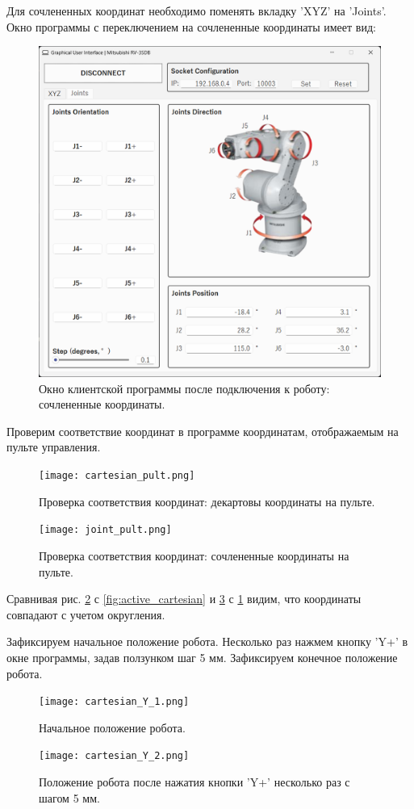 \documentclass[a4paper,14pt]{extarticle}
\begin{document}
Для сочлененных координат необходимо поменять вкладку 'XYZ' на 'Joints'.
Окно программы с переключением на сочлененные координаты имеет вид:
\begin{figure}[H]
    \centering
    \includegraphics[scale=0.5]{active_joint.png}
    \caption{Окно клиентской программы после подключения к роботу: сочлененные координаты.}
    \label{fig:active_joint}
\end{figure}


Проверим соответствие координат в программе координатам, отображаемым на пульте управления.
\begin{figure}[H]
    \centering
    \texttt{[image: cartesian\_pult.png]}
    \caption{Проверка соответствия координат: декартовы координаты на пульте.}
    \label{fig:cartesian_pult}
\end{figure}
\begin{figure}[H]
    \centering
    \texttt{[image: joint\_pult.png]}
    \caption{Проверка соответствия координат: сочлененные координаты на пульте.}
    \label{fig:joint_pult}
\end{figure}


Сравнивая рис. \ref{fig:cartesian_pult} с \ref{fig:active_cartesian}
и \ref{fig:joint_pult} с \ref{fig:active_joint} видим, что координаты
совпадают с учетом округления.


Зафиксируем начальное положение робота.
Несколько раз нажмем кнопку 'Y+' в окне программы, задав ползунком шаг 5 мм.
Зафиксируем конечное положение робота.
\begin{figure}[H]
    \centering
    \texttt{[image: cartesian\_Y\_1.png]}
    \caption{Начальное положение робота.}
    \label{fig:cartesian_Y_1}
\end{figure}
\begin{figure}[H]
    \centering
    \texttt{[image: cartesian\_Y\_2.png]}
    \caption{Положение робота после нажатия кнопки 'Y+' несколько раз с шагом 5 мм.}
    \label{fig:cartesian_Y_2}
\end{figure}
\end{document}
